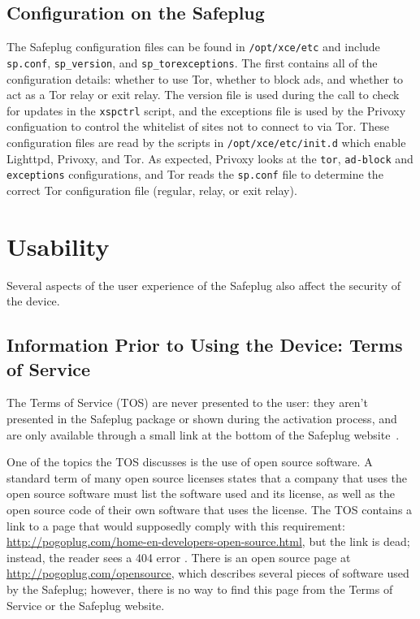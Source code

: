 \documentclass[letterpaper,twocolumn,10pt]{article}
\begin{document}
\subsection{Configuration on the Safeplug}
\label{spconfig}
The Safeplug configuration files can be found in \verb!/opt/xce/etc! and include \verb!sp.conf!, \verb!sp_version!, and \verb!sp_torexceptions!.  The first contains all of the configuration details: whether to use Tor, whether to block ads, and whether to act as a Tor relay or exit relay. The version file is used during the call to check for updates in the \verb!xspctrl! script, and the exceptions file is used by the Privoxy configuation to control the whitelist of sites not to connect to via Tor.  These configuration files are read by the scripts in \verb!/opt/xce/etc/init.d! which enable Lighttpd, Privoxy, and Tor.  As expected, Privoxy looks at the \verb!tor!, \verb!ad-block! and \verb!exceptions! configurations, and Tor reads the \verb!sp.conf! file to determine the correct Tor configuration file (regular, relay, or exit relay).

\section{Usability}
Several aspects of the user experience of the Safeplug also affect the security of the device.

\subsection{Information Prior to Using the Device: Terms of Service}
\label{tos}
The Terms of Service (TOS) are never presented to the user: they aren't presented in the Safeplug package or shown during the activation process, and are only available through a small link at the bottom of the Safeplug website~\cite{safeplug}.  

One of the topics the TOS discusses is the use of open source software.  A standard term of many open source licenses states that a company that uses the open source software must list the software used and its license, as well as the open source code of their own software that uses the license.  The TOS contains a link to a page that would supposedly comply with this requirement: \url{http://pogoplug.com/home-en-developers-open-source.html}, but the link is dead; instead, the reader sees a 404 error \cite{safeplug}.  There is an open source page at \url{http://pogoplug.com/opensource}, which describes several pieces of software used by the Safeplug; however, there is no way to find this page from the Terms of Service or the Safeplug website.
\end{document}
